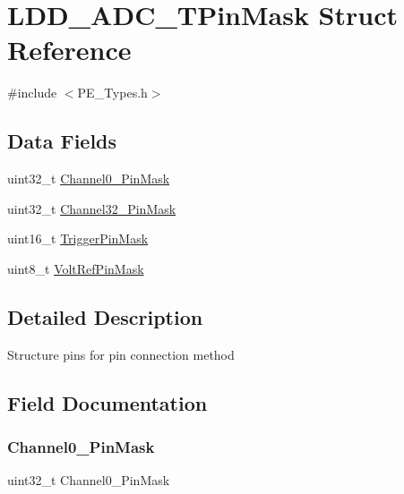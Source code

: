 \hypertarget{struct_l_d_d___a_d_c___t_pin_mask}{}\section{L\+D\+D\+\_\+\+A\+D\+C\+\_\+\+T\+Pin\+Mask Struct Reference}
\label{struct_l_d_d___a_d_c___t_pin_mask}


{\ttfamily \#include $<$P\+E\+\_\+\+Types.\+h$>$}

\subsection*{Data Fields}
\begin{DoxyCompactItemize}
\item 
uint32\+\_\+t \hyperlink{struct_l_d_d___a_d_c___t_pin_mask_a4d100f1a8302b4e104393f4df2db0c36}{Channel0\+\_\+Pin\+Mask}
\item 
uint32\+\_\+t \hyperlink{struct_l_d_d___a_d_c___t_pin_mask_a62e3f0a784a3ed70379d9606cbc1e3ce}{Channel32\+\_\+Pin\+Mask}
\item 
uint16\+\_\+t \hyperlink{struct_l_d_d___a_d_c___t_pin_mask_ad08a6ea79effcf4a5d79182a9cfb4cda}{Trigger\+Pin\+Mask}
\item 
uint8\+\_\+t \hyperlink{struct_l_d_d___a_d_c___t_pin_mask_a4b9d9c9b1db2fa96fdf152b63a7942c1}{Volt\+Ref\+Pin\+Mask}
\end{DoxyCompactItemize}


\subsection{Detailed Description}
Structure pins for pin connection method 

\subsection{Field Documentation}
\mbox{\label{struct_l_d_d___a_d_c___t_pin_mask_a4d100f1a8302b4e104393f4df2db0c36}} 
\subsubsection{\texorpdfstring{Channel0\+\_\+Pin\+Mask}{Channel0\_31PinMask}}
{\footnotesize\ttfamily uint32\+\_\+t Channel0\+\_\+Pin\+Mask}

